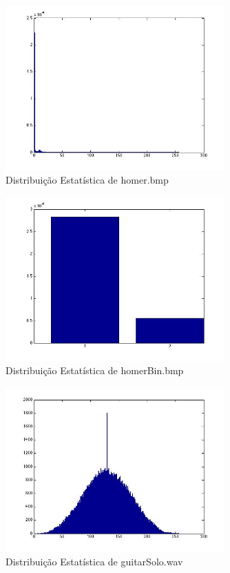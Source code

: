 \documentclass[12pt]{article}
\begin{document}
  \begin{figure}[H]
    \centering
      \includegraphics[width=0.75\textwidth]{ex3homer}
    \caption{Distribuição Estatística de homer.bmp}
  \end{figure}

  \begin{figure}[H]
    \centering
      \includegraphics[width=0.75\textwidth]{ex3homerbin}
    \caption{Distribuição Estatística de homerBin.bmp}
  \end{figure}

  \begin{figure}[H]
    \centering
      \includegraphics[width=0.75\textwidth]{ex3guitarsolo}
    \caption{Distribuição Estatística de guitarSolo.wav}
  \end{figure}
\end{document}
